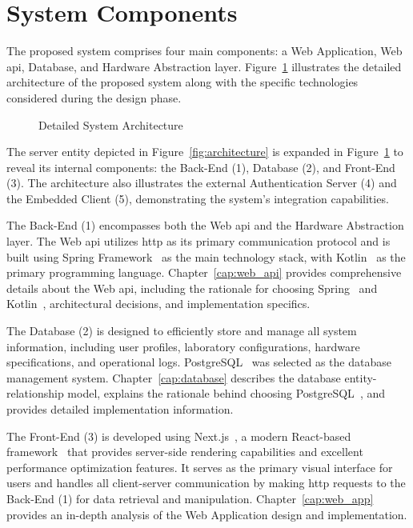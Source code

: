 \section{System Components}\label{sec:system_components}
The proposed system comprises four main components: a Web Application, Web \acs{api}, Database, and Hardware Abstraction layer. Figure~\ref{fig:detailed_architecture} illustrates the detailed architecture of the proposed system along with the specific technologies considered during the design phase.

\begin{figure}[H]
    \centering
    
\caption{Detailed System Architecture}
\label{fig:detailed_architecture}
\end{figure}

The server entity depicted in Figure~\ref{fig:architecture} is expanded in Figure~\ref{fig:detailed_architecture} to reveal its internal components: the Back-End (1), Database (2), and Front-End (3). The architecture also illustrates the external Authentication Server (4) and the Embedded Client (5), demonstrating the system's integration capabilities.

The Back-End (1) encompasses both the Web \acs{api} and the Hardware Abstraction layer. The Web \acs{api} utilizes \ac{http} as its primary communication protocol and is built using Spring Framework~\cite{spring-framework} as the main technology stack, with Kotlin~\cite{kotlin} as the primary programming language. Chapter~\ref{cap:web_api} provides comprehensive details about the Web \acs{api}, including the rationale for choosing Spring~\cite{spring} and Kotlin~\cite{kotlin}, architectural decisions, and implementation specifics.

The Database (2) is designed to efficiently store and manage all system information, including user profiles, laboratory configurations, hardware specifications, and operational logs. PostgreSQL~\cite{postgresql} was selected as the database management system. Chapter~\ref{cap:database} describes the database entity-relationship model, explains the rationale behind choosing PostgreSQL~\cite{postgresql}, and provides detailed implementation information.

The Front-End (3) is developed using Next.js~\cite{nextjs-docs}, a modern React-based framework~\cite{react} that provides server-side rendering capabilities and excellent performance optimization features. It serves as the primary visual interface for users and handles all client-server communication by making \acs{http} requests to the Back-End (1) for data retrieval and manipulation. Chapter~\ref{cap:web_app} provides an in-depth analysis of the Web Application design and implementation.

